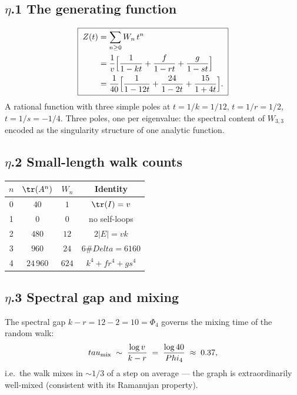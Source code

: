 \documentclass[12pt,a4paper]{article}
\def\Delta{Delta}%
\def\Phi#1{Phi#1}%
\def\tau{tau}%
\def\cdot{ }%
\theoremstyle{definition}
\begin{document}
\subsection*{$\eta$.1 \quad The generating function}
\[
\boxed{\;
\begin{aligned}
Z(t) &= \sum_{n\ge 0} W_n\,t^n \\
  &= \frac{1}{v}\Bigl[\frac{1}{1-kt} + \frac{f}{1-rt} + \frac{g}{1-st}\Bigr] \\
  &= \frac{1}{40}\Bigl[\frac{1}{1-12t} + \frac{24}{1-2t} + \frac{15}{1+4t}\Bigr].
\end{aligned}
\;}
\]
A rational function with three simple poles at $t = 1/k = 1/12$,
$t = 1/r = 1/2$, $t = 1/s = -1/4$. Three poles, one per eigenvalue:
the spectral content of $W_{3,3}$ encoded as the singularity structure
of one analytic function.

\subsection*{$\eta$.2 \quad Small-length walk counts}
\begin{center}
\begin{tabular}{cccc}
\toprule
$n$ & $\tr(A^n)$ & $W_n$ & Identity \\
\midrule
0 & $40$ & $1$ & $\tr(I) = v$ \\
1 & $0$ & $0$ & no self-loops \\
2 & $480$ & $12$ & $2|E| = vk$ \\
3 & $960$ & $24$ & $6\cdot\#\Delta = 6\cdot 160$ \\
4 & $24\,960$ & $624$ & $k^4 + f r^4 + g s^4$ \\
\bottomrule
\end{tabular}
\end{center}

\subsection*{$\eta$.3 \quad Spectral gap and mixing}
The spectral gap $k - r = 12 - 2 = 10 = \Phi_4$ governs the mixing
time of the random walk:
\[
\tau_{\rm mix} \;\sim\; \frac{\log v}{k - r} \;=\; \frac{\log 40}{\Phi_4} \;\approx\; 0.37,
\]
i.e.\ the walk mixes in $\sim 1/3$ of a step on average — the graph is
extraordinarily well-mixed (consistent with its Ramanujan property).
\end{document}
